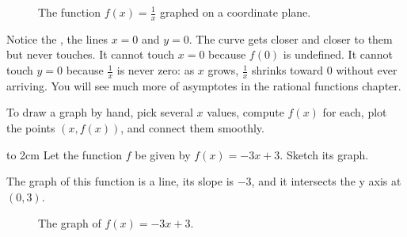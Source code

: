 \begin{figure}[H]
  \centering
  \caption{The function $f(x) = \frac{1}{x}$ graphed on a coordinate plane.}
  \label{fig:graphed2}
\end{figure}
Notice the , the lines $x=0$ and
$y=0$. The curve gets closer and closer to them but never touches. It cannot
touch $x = 0$ because $f(0)$ is undefined. It cannot touch $y = 0$ because
$\frac{1}{x}$ is never zero: as $x$ grows, $\frac{1}{x}$ shrinks toward 0
without ever arriving. You will see much more of asymptotes in the rational
functions chapter.

To draw a graph by hand, pick several $x$ values, compute $f(x)$ for each,
plot the points $(x, f(x))$, and connect them smoothly.
\begin{Exercise}[title={Draw a graph}, label=draw_graph]

  \vspace{2cm}

  \begin{center}
    \vbox to 2cm{\vfil
        Let the function $f$ be given by $f(x) = -3x + 3$. Sketch its graph.
        \vfil}
  \end{center}
\end{Exercise}
\begin{Answer}[ref=draw_graph]

  The graph of this function is a line, its slope is $-3$, and it intersects the y axis at $(0, 3)$.

  \begin{figure}[H]
    \centering
    \caption{The graph of $f(x) = -3x+3$.}
    \label{fig:ex1ans}
  \end{figure}
\end{Answer}


